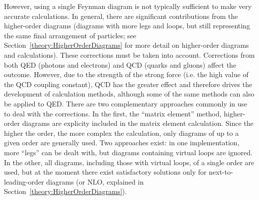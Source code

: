 However, using a single Feynman diagram is not typically 
sufficient to make very accurate calculations.  
In general, there are significant contributions from 
the higher-order diagrams  
(diagrams with more legs and loops, 
but still representing the same final arrangement of particles; 
see Section~\ref{theory:HigherOrderDiagrams} 
for more detail on higher-order 
diagrams and calculations). %
These corrections must be taken into account.  
Corrections from both QED (photons and electrons) 
and QCD (quarks and gluons) affect the outcome.  
However, due to the strength of the strong force 
(i.e. the high value of the QCD coupling constant), 
QCD has the greater effect %
and therefore drives the development 
of calculation methods, 
although some of the same methods can also be applied to QED.  
There are two complementary approaches commonly in use 
to deal with the corrections.  
In the first, the ``matrix element'' method, 
higher-order diagrams are explicity included in 
the matrix element calculation.  
Since the higher the order, 
the more complex the calculation, 
only diagrams of up to a given order are 
generally used.  
Two approaches exist: 
in one implementation, more ``legs'' can be dealt with, %
but diagrams containing virtual loops are ignored.  %
In the other, all diagrams, including those with virtual 
loops, of a single order are used, 
but at the moment there exist satisfactory solutions 
only for next-to-leading-order diagrams 
(or NLO, explained in 
Section~\ref{theory:HigherOrderDiagrams}).  
